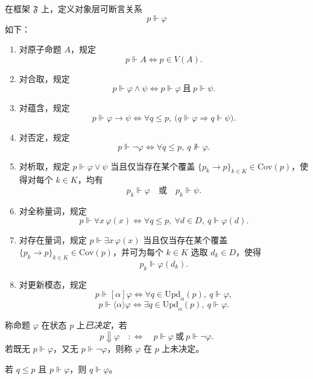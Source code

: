 \begin{definition}[forcing 关系]\label{def:observer-indexed-forcing}
在框架 \(\mathfrak F\) 上，定义对象层可断言关系
\[
p\Vdash \varphi
\]
如下：
\begin{enumerate}
  \item 对原子命题 \(A\)，规定
  \[
  p\Vdash A \Longleftrightarrow p\in V(A).
  \]
  \item 对合取，规定
  \[
  p\Vdash \varphi\land\psi
  \Longleftrightarrow
  p\Vdash \varphi\ \text{且}\ p\Vdash \psi.
  \]
  \item 对蕴含，规定
  \[
  p\Vdash \varphi\to\psi
  \Longleftrightarrow
  \forall q\le p,\ \bigl(q\Vdash \varphi \Rightarrow q\Vdash \psi\bigr).
  \]
  \item 对否定，规定
  \[
  p\Vdash \neg\varphi
  \Longleftrightarrow
  \forall q\le p,\ q\nVdash \varphi.
  \]
  \item 对析取，规定 \(p\Vdash \varphi\lor\psi\) 当且仅当存在某个覆盖 \(\{p_k\to p\}_{k\in K}\in\mathrm{Cov}(p)\)，使得对每个 \(k\in K\)，均有
  \[
  p_k\Vdash \varphi\quad \text{或}\quad p_k\Vdash \psi.
  \]
  \item 对全称量词，规定
  \[
  p\Vdash \forall x\,\varphi(x)
  \Longleftrightarrow
  \forall q\le p,\ \forall d\in D,\ q\Vdash \varphi(d).
  \]
  \item 对存在量词，规定 \(p\Vdash \exists x\,\varphi(x)\) 当且仅当存在某个覆盖 \(\{p_k\to p\}_{k\in K}\in\mathrm{Cov}(p)\)，并可为每个 \(k\in K\) 选取 \(d_k\in D\)，使得
  \[
  p_k\Vdash \varphi(d_k).
  \]
  \item 对更新模态，规定
  \[
  p\Vdash [\alpha]\varphi
  \Longleftrightarrow
  \forall q\in \mathrm{Upd}_\alpha(p),\ q\Vdash \varphi,
  \]
  \[
  p\Vdash \langle\alpha\rangle\varphi
  \Longleftrightarrow
  \exists q\in \mathrm{Upd}_\alpha(p),\ q\Vdash \varphi.
  \]
\end{enumerate}
\end{definition}

\begin{definition}[已决定]\label{def:observer-indexed-decided}
称命题 \(\varphi\) 在状态 \(p\) 上\emph{已决定}，若
\[
p\Downarrow \varphi
\quad:\Longleftrightarrow\quad
p\Vdash \varphi\ \text{或}\ p\Vdash \neg\varphi.
\]
若既无 \(p\Vdash \varphi\)，又无 \(p\Vdash \neg\varphi\)，则称 \(\varphi\) 在 \(p\) 上未决定。
\end{definition}

\begin{proposition}\label{prop:observer-indexed-forcing-monotonicity}
若 \(q\le p\) 且 \(p\Vdash \varphi\)，则 \(q\Vdash \varphi\)。
\end{proposition}

